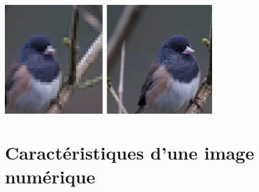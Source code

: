 \documentclass[svgnames,11pt]{beamer}
\begin{document}
\begin{frame}
    \frametitle{}

    \begin{center}
        \centering
        \includegraphics[width=9cm]{ressources/pixelisee.jpg}
        \label{IMG}
    \end{center}

\end{frame}
\section{Caractéristiques d'une image numérique}
\end{document}
